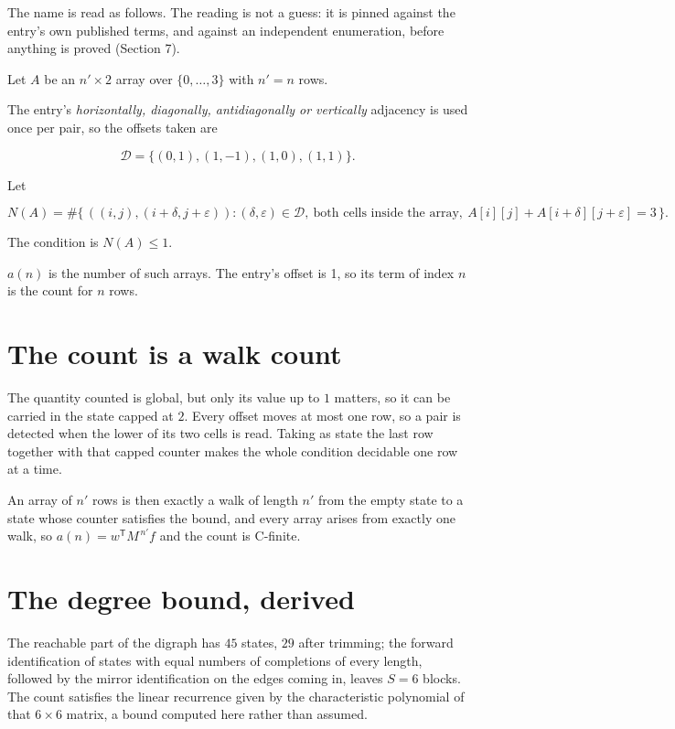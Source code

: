 \documentclass[11pt]{article}
\theoremstyle{definition}
\begin{document}
The name is read as follows. The reading is not a guess: it is pinned against the entry's own published terms, and against an independent enumeration, before anything is proved (Section 7).

Let $A$ be an $n' \times 2$ array over $\{0,\dots,3\}$ with $n' = n$ rows.

The entry's {\itshape horizontally, diagonally, antidiagonally or vertically} adjacency is used once per pair, so the offsets taken are

\[\mathcal{D} = \{(0,1), (1,-1), (1,0), (1,1)\}.\]

Let

\[N(A) = \#\bigl\{\,((i,j),(i{+}\delta,j{+}\varepsilon)) : (\delta,\varepsilon) \in \mathcal{D},\ \text{both cells inside the array},\ A[i][j] + A[i{+}\delta][j{+}\varepsilon] = 3\,\bigr\}.\]

The condition is $N(A) \le 1$.

$a(n)$ is the number of such arrays. The entry's offset is 1, so its term of index $n$ is the count for $n$ rows.

\section{The count is a walk count}

The quantity counted is global, but only its value up to $1$ matters, so it can be carried in the state capped at $2$. Every offset moves at most one row, so a pair is detected when the lower of its two cells is read. Taking as state the last row together with that capped counter makes the whole condition decidable one row at a time.

An array of $n'$ rows is then exactly a walk of length $n'$ from the empty state to a state whose counter satisfies the bound, and every array arises from exactly one walk, so $a(n) = w^{\mathsf T}M^{\,n'}f$ and the count is C-finite.

\section{The degree bound, derived}

The reachable part of the digraph has $45$ states, $29$ after trimming; the forward identification of states with equal numbers of completions of every length, followed by the mirror identification on the edges coming in, leaves $S = 6$ blocks. The count satisfies the linear recurrence given by the characteristic polynomial of that $6\times6$ matrix, a bound computed here rather than assumed.
\end{document}
